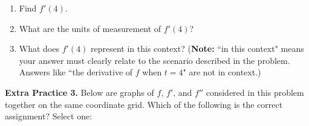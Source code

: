 \documentclass[10pt]{article}
\begin{document}
\begin{enumerate}


\item[(a)] Find $f'(4)$. 


\vfill
\vfill

\item[(b)] What are the units of measurement of $f'(4)$? 

\item[(c)] What does $f'(4)$ represent in this context? ({\bf Note:} ``in this context" means your answer must clearly relate to the scenario described in the problem. Answers like ``the derivative of $f$ when $t=4$" are not in context.)


\vfill
\end{enumerate}
{\bf\color{blue}Extra Practice 3.}   Below are graphs of $f$, $f'$, and $f''$ considered in this problem together on the same coordinate grid. Which of the following is the correct assignment? Select one:\\
\end{document}
